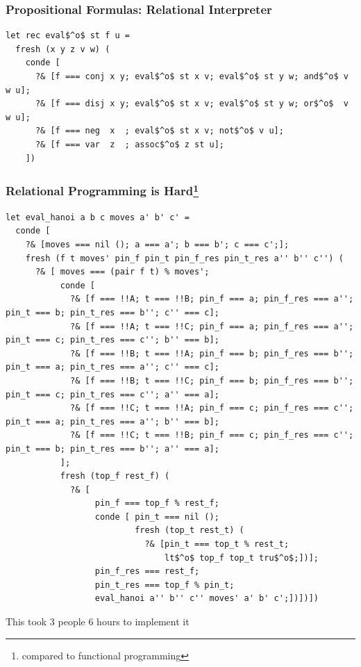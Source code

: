 \documentclass[xcolor=table]{beamer}
\begin{document}
\begin{frame}[fragile]
  \transwipe[direction=90]
  \frametitle{Propositional Formulas: Relational Interpreter}

  
\begin{lstlisting}
let rec eval$^o$ st f u =
  fresh (x y z v w) (
    conde [
      ?& [f === conj x y; eval$^o$ st x v; eval$^o$ st y w; and$^o$ v w u];
      ?& [f === disj x y; eval$^o$ st x v; eval$^o$ st y w; or$^o$  v w u];
      ?& [f === neg  x  ; eval$^o$ st x v; not$^o$ v u];
      ?& [f === var  z  ; assoc$^o$ z st u];
    ])

\end{lstlisting}

\end{frame}

\begin{frame}[fragile]
  \transwipe[direction=90]
  \frametitle{Relational Programming is Hard\footnote{compared to functional programming}}
\begin{lstlisting}[basicstyle=\tiny]
let eval_hanoi a b c moves a' b' c' = 
  conde [  
    ?& [moves === nil (); a === a'; b === b'; c === c';];
    fresh (f t moves' pin_f pin_t pin_f_res pin_t_res a'' b'' c'') (
      ?& [ moves === (pair f t) % moves';
           conde [
             ?& [f === !!A; t === !!B; pin_f === a; pin_f_res === a''; pin_t === b; pin_t_res === b''; c'' === c]; 
             ?& [f === !!A; t === !!C; pin_f === a; pin_f_res === a''; pin_t === c; pin_t_res === c''; b'' === b]; 
             ?& [f === !!B; t === !!A; pin_f === b; pin_f_res === b''; pin_t === a; pin_t_res === a''; c'' === c]; 
             ?& [f === !!B; t === !!C; pin_f === b; pin_f_res === b''; pin_t === c; pin_t_res === c''; a'' === a]; 
             ?& [f === !!C; t === !!A; pin_f === c; pin_f_res === c''; pin_t === a; pin_t_res === a''; b'' === b]; 
             ?& [f === !!C; t === !!B; pin_f === c; pin_f_res === c''; pin_t === b; pin_t_res === b''; a'' === a]; 
           ];     
           fresh (top_f rest_f) (
             ?& [ 
                  pin_f === top_f % rest_f;
                  conde [ pin_t === nil (); 
                          fresh (top_t rest_t) (
                            ?& [pin_t === top_t % rest_t; 
                                lt$^o$ top_f top_t tru$^o$;])];
                  pin_f_res === rest_f;
                  pin_t_res === top_f % pin_t;
                  eval_hanoi a'' b'' c'' moves' a' b' c';])])])
\end{lstlisting}

\begin{center} This took 3 people 6 hours to implement it \end{center}
\end{frame}
\end{document}
